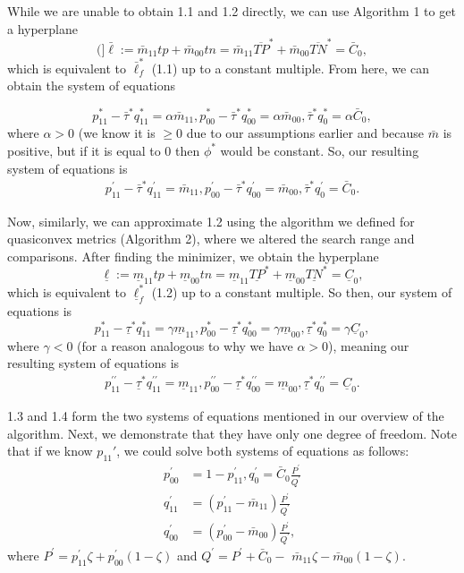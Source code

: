 \documentclass[
  letterpaper,
  DIV=11,
  numbers=noendperiod,
  oneside]{scrreprt}
\theoremstyle{remark}
\begin{document}
While we are unable to obtain 1.1 and 1.2 directly, we can use Algorithm
1 to get a hyperplane
\[(]\bar{\ell}:=\bar{m}_{11} t p+\bar{m}_{00} t n= \bar{m}_{11} \overline{T P}^{*}+\bar{m}_{00} \overline{T N}^{*} = \bar{C}_{0},\]
which is equivalent to \(\bar{\ell}_{f}^{*}\) (1.1) up to a constant
multiple. From here, we can obtain the system of equations

\[p_{11}^{*}-\bar{\tau}^{*} q_{11}^{*}=\alpha \bar{m}_{11}, p_{00}^{*}-\bar{\tau}^{*} q_{00}^{*}=\alpha \bar{m}_{00}, \bar{\tau}^{*} q_{0}^{*}=\alpha \bar{C}_{0},\]
where \(\alpha > 0\) (we know it is \(\geq0\) due to our assumptions
earlier and because \(\bar{m}\) is positive, but if it is equal to \(0\)
then \(\phi^*\) would be constant. So, our resulting system of equations
is \[\begin{aligned}
    p_{11}^{\prime}-\bar{\tau}^{*} q_{11}^{\prime}=\bar{m}_{11}, p_{00}^{\prime}-\bar{\tau}^{*} q_{00}^{\prime}=\bar{m}_{00}, \bar{\tau}^{*} q_{0}^{\prime}=\bar{C}_{0}.
\end{aligned}\]

Now, similarly, we can approximate 1.2 using the algorithm we defined
for quasiconvex metrics (Algorithm 2), where we altered the search range
and comparisons. After finding the minimizer, we obtain the hyperplane
\[\underline{\ell}:=\underline{m}_{11} t p+\underline{m}_{00} t n=\underline{m}_{11} \underline{TP}^{*}+\underline{m}_{00} \underline{TN}^{*} = \underline{C}_{0},\]
which is equivalent to \(\underline{\ell}_{f}^{*}\) (1.2) up to a
constant multiple. So then, our system of equations is
\[p_{11}^{*}-\underline{\tau}^{*} q_{11}^{*}=\gamma \underline{m}_{11}, p_{00}^{*}-\underline{\tau}^{*} q_{00}^{*}=\gamma \underline{m}_{00}, \underline{\tau}^{*} q_{0}^{*}=\gamma \underline{C}_{0},\]
where \(\gamma <0\) (for a reason analogous to why we have
\(\alpha >0\)), meaning our resulting system of equations is
\[\begin{aligned}
    p_{11}^{\prime \prime}-\underline{\tau}^{*} q_{11}^{\prime \prime}=\underline{m}_{11}, p_{00}^{\prime \prime}-\underline{\tau}^{*} q_{00}^{\prime \prime}=\underline{m}_{00}, \underline{\tau}^{*} q_{0}^{\prime \prime}=\underline{C}_{0}.
\end{aligned}\]

1.3 and 1.4 form the two systems of equations mentioned in our overview
of the algorithm. Next, we demonstrate that they have only one degree of
freedom. Note that if we know \(p_{11}'\), we could solve both systems
of equations as follows: \[\begin{aligned}
    p_{00}^{\prime}  &=1-p_{11}^{\prime}, q_{0}^{\prime}=\bar{C}_{0} \frac{P^{\prime}}{Q^{\prime}}\\
    q_{11}^{\prime}  &=\left(p_{11}^{\prime}-\bar{m}_{11}\right) \frac{P^{\prime}}{Q^{\prime}} \\
    q_{00}^{\prime}&=\left(p_{00}^{\prime}-\bar{m}_{00}\right) \frac{P^{\prime}}{Q^{\prime}},
\end{aligned}\] where
\(P^{\prime}=p_{11}^{\prime} \zeta+p_{00}^{\prime}(1-\zeta)\) and
\(Q^{\prime}=P^{\prime}+\bar{C}_{0}-\)
\(\bar{m}_{11} \zeta-\bar{m}_{00}(1-\zeta).\)
\end{document}
